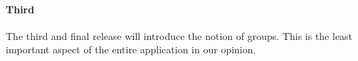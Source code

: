 \documentclass[10pt,a4paper,BCOR12mm, headexclude, footexclude,
  twoside, openright]{scrartcl}
\numberwithin{equation}{section} %
\numberwithin{figure}{section} %
\numberwithin{table}{section} %
\begin{document}
\paragraph{Third} The third and final release will introduce the notion of
groups. This is the least important aspect of the entire application in our
opinion.





\end{document}
